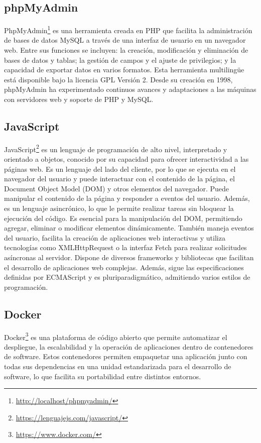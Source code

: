 \documentclass[a4paper, 12pt]{book}
\begin{document}
\subsection{phpMyAdmin}
\label{subsec:phpmyadmin} 
PhpMyAdmin\footnote{\url{http://localhost/phpmyadmin/}} es una herramienta creada en PHP que facilita la administración de bases de datos 
MySQL a través de una interfaz de usuario en un navegador web. 
Entre sus funciones se incluyen\cite{phpmyadmin}: la creación, modificación y eliminación de bases de datos y tablas; la gestión de campos y el ajuste de privilegios; y la 
capacidad de exportar datos en varios formatos. Esta herramienta multilingüe está disponible bajo la licencia GPL Versión 2. Desde su creación en 1998, 
phpMyAdmin ha experimentado continuos avances y adaptaciones a las máquinas con servidores web y soporte de PHP y MySQL.

\subsection{JavaScript}
\label{subsec:JavaScript} 
JavaScript\footnote{\url{https://lenguajejs.com/javascript/}} es un lenguaje de programación de alto nivel, interpretado y orientado a objetos, conocido por su capacidad para ofrecer 
interactividad a las páginas web. Es un lenguaje del lado del cliente, por lo que se ejecuta en el navegador del usuario y puede interactuar con el contenido 
de la página, el Document Object Model (DOM) y otros elementos del navegador. Puede manipular el contenido de la página y responder a eventos del usuario. 
Además, es un lenguaje asincrónico, lo que le permite realizar tareas sin bloquear la ejecución del código. Es esencial para la manipulación del DOM, permitiendo 
agregar, eliminar o modificar elementos dinámicamente. También maneja eventos del usuario, facilita la creación de aplicaciones web interactivas y utiliza 
tecnologías como XMLHttpRequest o la interfaz Fetch para realizar solicitudes asíncronas al servidor. Dispone de diversos frameworks y bibliotecas que facilitan 
el desarrollo de aplicaciones web complejas. Además, sigue las especificaciones definidas por ECMAScript y es pluriparadigmático, admitiendo varios estilos de 
programación.

\subsection{Docker}
\label{subsec:Docker}
Docker\footnote{\url{https://www.docker.com/}} es una plataforma de código abierto que permite automatizar el despliegue, la escalabilidad y la operación de 
aplicaciones dentro de contenedores de software. Estos contenedores permiten empaquetar una aplicación junto con todas sus dependencias en una unidad estandarizada 
para el desarrollo de software, lo que facilita su portabilidad entre distintos entornos.
\end{document}
